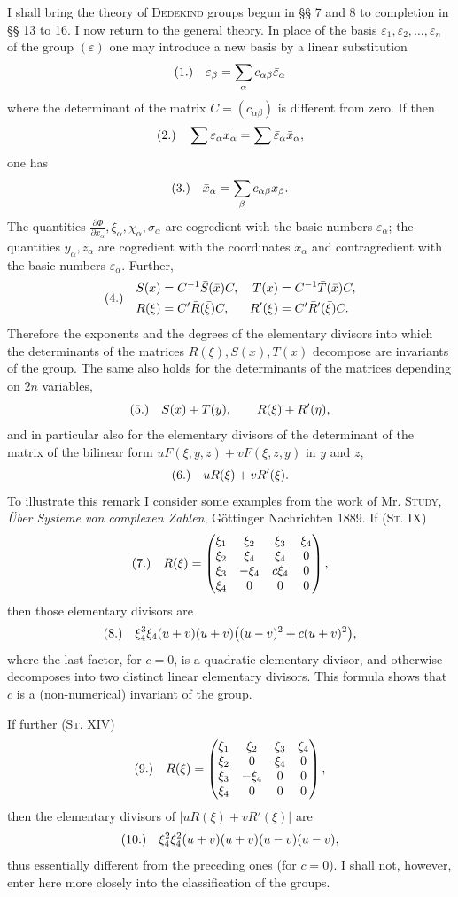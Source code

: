 \documentclass[11pt]{article}
\newcommand{\eps}{\varepsilon}
\newcommand{\fnum}[1]{\textup{(\ensuremath{#1}.)}\quad}
\begin{document}
I shall bring the theory of \textsc{Dedekind} groups begun in §§ 7 and 8 to completion in §§ 13 to 16. I now return to the general theory. In place of the basis $\eps_1,\eps_2,\ldots,\eps_n$ of the group $(\eps)$ one may introduce a new basis by a linear substitution
\[
\fnum{1} \eps_\beta=\sum_\alpha c_{\alpha\beta}\bar\eps_\alpha
\]
where the determinant of the matrix $C=(c_{\alpha\beta})$ is different from zero. If then
\[
\fnum{2} \sum \eps_\alpha x_\alpha=\sum\bar\eps_\alpha\bar x_\alpha,
\]
one has
\[
\fnum{3} \bar x_\alpha=\sum_\beta c_{\alpha\beta}x_\beta.
\]
The quantities $\frac{\partial\Phi}{\partial x_\alpha},\xi_\alpha,\chi_\alpha,\sigma_\alpha$ are cogredient with the basic numbers $\eps_\alpha$; the quantities $y_\alpha,z_\alpha$ are cogredient with the coordinates $x_\alpha$ and contragredient with the basic numbers $\eps_\alpha$. Further,
\[
\fnum{4}
\begin{aligned}
S(x)&=C^{-1}\bar S(\bar x)C,
& T(x)&=C^{-1}\bar T(\bar x)C,\\
R(\xi)&=C'\bar R(\bar\xi)C,
& R'(\xi)&=C'\bar R'(\bar\xi)C.
\end{aligned}
\]
Therefore the exponents and the degrees of the elementary divisors into which the determinants of the matrices $R(\xi),S(x),T(x)$ decompose are invariants of the group. The same also holds for the determinants of the matrices depending on $2n$ variables,
\[
\fnum{5} S(x)+T(y),\qquad R(\xi)+R'(\eta),
\]
and in particular also for the elementary divisors of the determinant of the matrix of the bilinear form $uF(\xi,y,z)+vF(\xi,z,y)$ in $y$ and $z$,
\[
\fnum{6} uR(\xi)+vR'(\xi).
\]
To illustrate this remark I consider some examples from the work of Mr. \textsc{Study}, \emph{Über Systeme von complexen Zahlen}, Göttinger Nachrichten 1889. If (\textsc{St}. IX)
\[
\fnum{7} R(\xi)=
\begin{pmatrix}
\xi_1&\xi_2&\xi_3&\xi_4\\
\xi_2&\xi_4&\xi_4&0\\
\xi_3&-\xi_4&c\xi_4&0\\
\xi_4&0&0&0
\end{pmatrix},
\]
then those elementary divisors are
\[
\fnum{8} \xi_4^3\xi_4(u+v)(u+v)\bigl((u-v)^2+c(u+v)^2\bigr),
\]
where the last factor, for $c=0$, is a quadratic elementary divisor, and otherwise decomposes into two distinct linear elementary divisors. This formula shows that $c$ is a (non-numerical) invariant of the group.

If further (\textsc{St}. XIV)
\[
\fnum{9} R(\xi)=
\begin{pmatrix}
\xi_1&\xi_2&\xi_3&\xi_4\\
\xi_2&0&\xi_4&0\\
\xi_3&-\xi_4&0&0\\
\xi_4&0&0&0
\end{pmatrix},
\]
then the elementary divisors of $|uR(\xi)+vR'(\xi)|$ are
\[
\fnum{10} \xi_4^2\xi_4^2(u+v)(u+v)(u-v)(u-v),
\]
thus essentially different from the preceding ones (for $c=0$). I shall not, however, enter here more closely into the classification of the groups.
\end{document}
